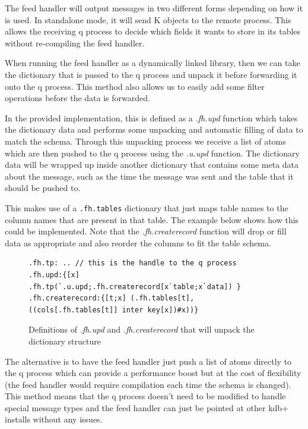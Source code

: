 The feed handler will output messages in two different forms depending on how it is used.
In standalone mode, it will send K objects to the remote process. This allows the receiving
q process to decide which fields it wants to store in its tables without re-compiling the
feed handler.

When running the feed handler as a dynamically linked library, then we can take the dictionary
that is passed to the q process and unpack it before forwarding it onto the q process. This
method also allows us to easily add some filter operations before the data is forwarded.

In the provided implementation, this is defined as a \textit{.fh.upd} function which takes
the dictionary data and performs some unpacking and automatic filling of data to match the
schema. Through this unpacking process we receive a list of atoms which are then pushed to
the q process using the \textit{.u.upd} function. The dictionary data will be wrapped up
inside another dictionary that contains some meta data about the message, such as the time
the message was sent and the table that it should be pushed to.

This makes use of a \verb|.fh.tables| dictionary that just maps table names to the column names that
are present in that table. The example below shows how this could be implemented. Note that the
\textit{.fh.createrecord} function will drop or fill data as appropriate and also reorder the columns
to fit the table schema.

\begin{figure}
\begin{lstlisting}
.fh.tp: .. // this is the handle to the q process
.fh.upd:{[x] .fh.tp(`.u.upd;.fh.createrecord[x`table;x`data]) }
.fh.createrecord:{[t;x] (.fh.tables[t],((cols[.fh.tables[t]] inter key[x])#x))}
\end{lstlisting}
\caption{Definitions of \textit{.fh.upd} and \textit{.fh.createrecord} that will unpack the dictionary structure}
\end{figure}

The alternative is to have the feed handler just push a list of atoms directly to the q process
which can provide a performance boost but at the cost of flexibility (the feed handler would
require compilation each time the schema is changed). This method means that the q process doesn't
need to be modified to handle special message types and the feed handler can just be pointed at other
kdb+ installs without any issues.


